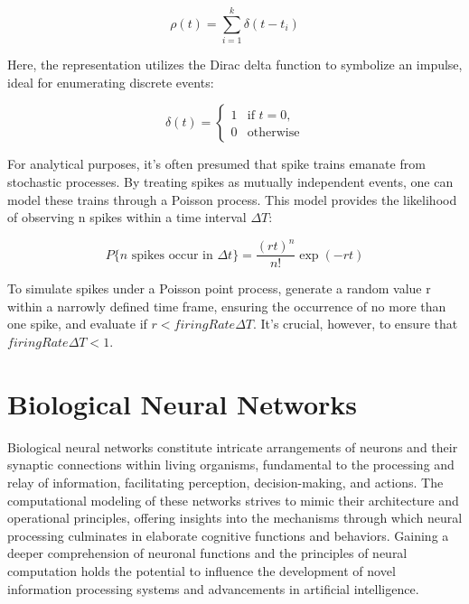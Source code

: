 \documentclass[12pt,a4paper]{report}
\begin{document}
\begin{equation}
    \rho(t) = \sum_{i=1}^{k} \delta(t-t_i)
\end{equation}

Here, the representation utilizes the Dirac delta function to symbolize an impulse, ideal for enumerating discrete events:

\begin{equation}
    \delta(t) = \begin{cases} 1 & \text{if } t = 0, \\ 0 & \text{otherwise} \end{cases}
\end{equation}

For analytical purposes, it's often presumed that spike trains emanate from stochastic processes. By treating spikes as mutually independent events, one can model these trains through a Poisson process. This model provides the likelihood of observing n spikes within a time interval $\Delta T$:

\begin{equation}
    P\{n \text{ spikes occur in } \Delta t\} = \frac{(rt)^n}{n!} \exp(-rt)
\end{equation}

To simulate spikes under a Poisson point process, generate a random value r within a narrowly defined time frame, ensuring the occurrence of no more than one spike, and evaluate if $r < firingRate \Delta T$. It's crucial, however, to ensure that $firingRate\Delta T < 1$.

\section{Biological Neural Networks}
Biological neural networks constitute intricate arrangements of neurons and their synaptic connections within living organisms, fundamental to the processing and relay of information, facilitating perception, decision-making, and actions. The computational modeling of these networks strives to mimic their architecture and operational principles, offering insights into the mechanisms through which neural processing culminates in elaborate cognitive functions and behaviors. Gaining a deeper comprehension of neuronal functions and the principles of neural computation holds the potential to influence the development of novel information processing systems and advancements in artificial intelligence.
\end{document}
